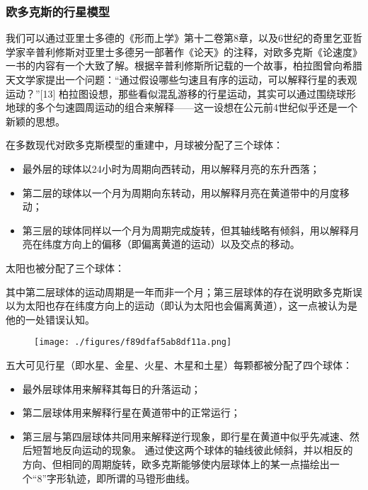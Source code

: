 \subsubsection{欧多克斯的行星模型}
我们可以通过亚里士多德的《形而上学》第十二卷第8章，以及6世纪的奇里乞亚哲学家辛普利修斯对亚里士多德另一部著作《论天》的注释，对欧多克斯《论速度》一书的内容有一个大致了解。根据辛普利修斯所记载的一个故事，柏拉图曾向希腊天文学家提出一个问题：“通过假设哪些匀速且有序的运动，可以解释行星的表观运动？”[13] 柏拉图设想，那些看似混乱游移的行星运动，其实可以通过围绕球形地球的多个匀速圆周运动的组合来解释——这一设想在公元前4世纪似乎还是一个新颖的思想。

在多数现代对欧多克斯模型的重建中，月球被分配了三个球体：
\begin{itemize}
\item 最外层的球体以24小时为周期向西转动，用以解释月亮的东升西落；
\item 第二层的球体以一个月为周期向东转动，用以解释月亮在黄道带中的月度移动；
\item 第三层的球体同样以一个月为周期完成旋转，但其轴线略有倾斜，用以解释月亮在纬度方向上的偏移（即偏离黄道的运动）以及交点的移动。
\end{itemize}
太阳也被分配了三个球体：

其中第二层球体的运动周期是一年而非一个月；第三层球体的存在说明欧多克斯误以为太阳也存在纬度方向上的运动（即认为太阳也会偏离黄道），这一点被认为是他的一处错误认知。
\begin{figure}[ht]
\centering
\texttt{[image: ./figures/f89dfaf5ab8df11a.png]}
\caption{} \label{fig_ODK_1}
\end{figure}
五大可见行星（即水星、金星、火星、木星和土星）每颗都被分配了四个球体：
\begin{itemize}
\item 最外层球体用来解释其每日的升落运动；
\item 第二层球体用来解释行星在黄道带中的正常运行；
\item 第三层与第四层球体共同用来解释逆行现象，即行星在黄道中似乎先减速、然后短暂地反向运动的现象。
通过使这两个球体的轴线彼此倾斜，并以相反的方向、但相同的周期旋转，欧多克斯能够使内层球体上的某一点描绘出一个“8”字形轨迹，即所谓的马镫形曲线。
\end{itemize}

